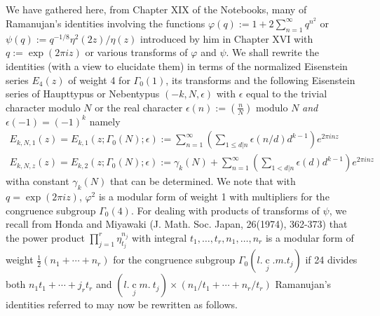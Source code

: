 \subsection{}\label{art8-sec1.2}
We have gathered here, from Chapter XIX of the Notebooks, many of Ramanujan's identities involving the functions $\varphi(q):=1+2\sum\limits^{\infty}_{n=1}q^{n^{2}}$ or $\psi(q):=q^{-1/8}\eta^{2}(2z)/\eta(z)$ introduced by him in Chapter XVI with $q:=\exp (2\pi iz)$ or various transforms of $\varphi$ and $\psi$. We shall rewrite the identities (with a view to elucidate them) in terms of the normalized Eisenstein series $E_{4}(z)$ of weight 4 for $\Gamma_{0}(1)$, its transforms and the following Eisenstein series of Haupttypus or Nebentypus $(-k,N,\epsilon)$ with $\epsilon$ equal to the trivial character modulo $N$ or the real character $\epsilon(n):=(\frac{n}{N})$ modulo $N$ {\em and} $\epsilon(-1)=(-1)^{k}$ namely
\begin{gather*}
E_{k,N,1}(z)=E_{k,1}(z;\Gamma_{0}(N);\epsilon):=\sum\limits^{\infty}_{n=1}\left(\sum\limits_{1\leq d|n}\epsilon(n/d)d^{k-1}\right)e^{2\pi inz}\\
E_{k,N,z}(z)=E_{k,2}(z;\Gamma_{0}(N);\epsilon):=\gamma_{k}(N)+\sum\limits^{\infty}_{n=1}\left(\sum\limits_{1<d|n}\epsilon(d)d^{k-1}\right)e^{2\pi inz}
\end{gather*}
with\pageoriginale a constant $\gamma_{k}(N)$ that can be determined. We note that with $q=\exp(2\pi iz)$, $\varphi^{2}$ is a modular form of weight 1 with multipliers for the congruence subgroup $\Gamma_{0}(4)$. For dealing with products of transforms of $\psi$, we recall from Honda and Miyawaki (J. Math. Soc. Japan, 26(1974), 362-373) that the power product $\prod\limits^{r}_{j=1}\eta^{n_{j}}_{t_{j}}$ with integral $t_{1},\ldots,t_{r}, n_{1},\ldots,n_{r}$ is a modular form of weight $\frac{1}{2}(n_{1}+\cdots+n_{r})$ for the congruence subgroup $\Gamma_{0}(l.\displaystyle{\mathop{c}\limits_{j}}.m.t_{j})$ if 24 divides both $n_{1}t_{1}+\cdots+j_{r}t_{r}$ and $(l.\displaystyle{\mathop{c}\limits_{j}}m. \ t_{j})\times (n_{1}/t_{1}+\cdots+n_{r}/t_{r})$ Ramanujan's identities referred to may now be rewritten as follows.
